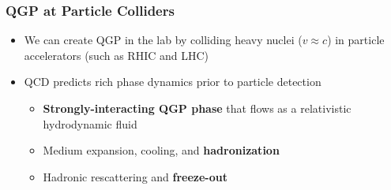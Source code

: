 \documentclass[9pt]{beamer}
\begin{document}
     \begin{frame}
       \frametitle{\textbf{QGP at Particle Colliders}}
       \begin{itemize}
       \item We can create QGP in the lab by colliding heavy nuclei ($v \approx c$) in particle accelerators (such as RHIC and LHC)
       \item QCD predicts rich phase dynamics prior to particle detection
         \begin{itemize}
         \item \textbf{Strongly-interacting QGP phase} that flows as a relativistic hydrodynamic fluid
         \item Medium expansion, cooling, and \textbf{hadronization}
         \item Hadronic rescattering and \textbf{freeze-out}
         \end{itemize}
       \end{itemize}

       \
       
       \centering
     \end{frame}
\end{document}
